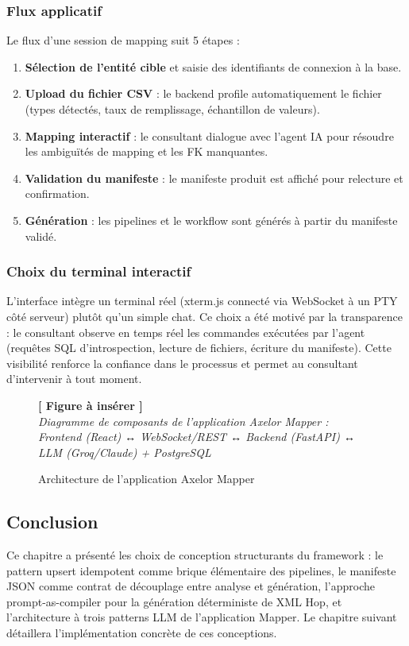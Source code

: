 \documentclass[a4paper,12pt]{article}
\newcommand{\insertfig}[3][0.80]{%
  \begin{figure}[H]
  \centering
  \colorbox{placeholderbg}{\parbox{#1\textwidth}{%
    \vspace{1.6cm}
    \centering
    {\large\color{placeholderborder}\textbf{[ Figure à insérer ]}}\\[0.5cm]
    {\small\color{gray}\textit{#2}}%
    \vspace{1.6cm}
  }}
  \caption{#3}
  \end{figure}
}
\begin{document}
\subsubsection{Flux applicatif}

Le flux d'une session de mapping suit 5 étapes :

\begin{enumerate}
  \item \textbf{Sélection de l'entité cible} et saisie des identifiants de connexion à la base.
  \item \textbf{Upload du fichier CSV} : le backend profile automatiquement le fichier (types détectés, taux de remplissage, échantillon de valeurs).
  \item \textbf{Mapping interactif} : le consultant dialogue avec l'agent IA pour résoudre les ambiguïtés de mapping et les FK manquantes.
  \item \textbf{Validation du manifeste} : le manifeste produit est affiché pour relecture et confirmation.
  \item \textbf{Génération} : les pipelines et le workflow sont générés à partir du manifeste validé.
\end{enumerate}

\subsubsection{Choix du terminal interactif}

L'interface intègre un terminal réel (xterm.js connecté via WebSocket à un PTY côté serveur) plutôt qu'un simple chat. Ce choix a été motivé par la transparence : le consultant observe en temps réel les commandes exécutées par l'agent (requêtes SQL d'introspection, lecture de fichiers, écriture du manifeste). Cette visibilité renforce la confiance dans le processus et permet au consultant d'intervenir à tout moment.

\insertfig{Diagramme de composants de l'application Axelor Mapper : Frontend (React) ↔ WebSocket/REST ↔ Backend (FastAPI) ↔ LLM (Groq/Claude) + PostgreSQL}{Architecture de l'application Axelor Mapper}

\subsection{Conclusion}

Ce chapitre a présenté les choix de conception structurants du framework : le pattern upsert idempotent comme brique élémentaire des pipelines, le manifeste JSON comme contrat de découplage entre analyse et génération, l'approche prompt-as-compiler pour la génération déterministe de XML Hop, et l'architecture à trois patterns LLM de l'application Mapper. Le chapitre suivant détaillera l'implémentation concrète de ces conceptions.
\end{document}

